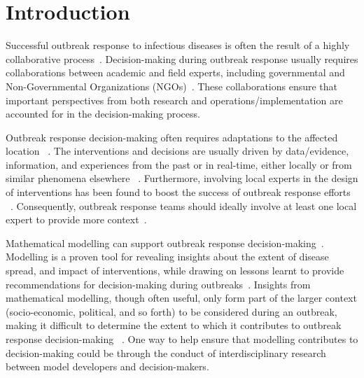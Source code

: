 \documentclass[10pt,letterpaper]{article}
\begin{document}
\linenumbers

\section*{Introduction}
Successful outbreak response to infectious diseases is often the result of a highly collaborative process~\cite{Sigfrid2020}. Decision-making during outbreak response usually requires collaborations between academic and field experts, including governmental and Non-Governmental Organizations (NGOs)~\cite{Kretzschmar2020,Kerkhove2012,Okiror2021,Whitty2014,Sigfrid2020}. These collaborations ensure that important perspectives from both research and operations/implementation are accounted for in the decision-making process. 

Outbreak response decision-making often requires adaptations to the affected location ~\cite{Whitty2014,Heesterbeek2015,Sigfrid2020}. The interventions and decisions are usually driven by data/evidence, information, and experiences from the past or in real-time, either locally or from similar phenomena elsewhere ~\cite{Abramowitz2015,Kerkhove2012}. Furthermore, involving local experts in the design of interventions has been found to boost the success of outbreak response efforts ~\cite{Sigfrid2020}. Consequently, outbreak response teams should ideally involve at least one local expert to provide more context~\cite{Sigfrid2020}.  

Mathematical modelling can support outbreak response decision-making~\cite{Lofgren2015}. Modelling is a proven tool for revealing insights about the extent of disease spread, and impact of interventions, while drawing on lessons learnt to provide recommendations for decision-making during outbreaks~\cite{Kretzschmar2020,Whitty2014,Lofgren2015}. Insights from mathematical modelling, though often useful, only form part of the larger context (socio-economic, political, and so forth) to be considered during an outbreak, making it difficult to determine the extent to which it contributes to outbreak response decision-making ~\cite{Kretzschmar2020,Kerkhove2012}. One way to help ensure that modelling contributes to decision-making could be through the conduct of interdisciplinary research between model developers and decision-makers.
\end{document}
